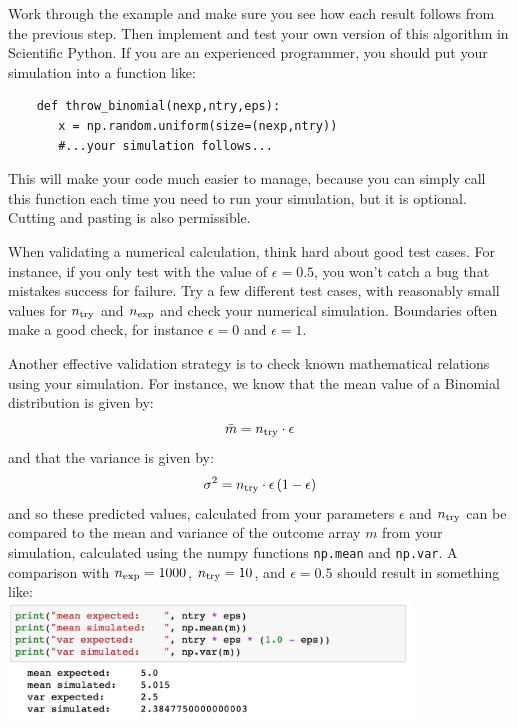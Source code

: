 Work through the example and make sure you see how each result follows
from the previous step.  Then implement and test your own version of
this algorithm in Scientific Python.  If you are an experienced
programmer, you should put your simulation into a function like:
\begin{verbatim}
    def throw_binomial(nexp,ntry,eps):
       x = np.random.uniform(size=(nexp,ntry))
       #...your simulation follows...    
\end{verbatim}

This will make your code much easier to manage, because you can simply
call this function each time you need to run your simulation, but it
is optional.  Cutting and pasting is also permissible.

When validating a numerical calculation, think hard about good test
cases.  For instance, if you only test with the value of $\epsilon =
0.5$, you won't catch a bug that mistakes success for failure.  Try a
few different test cases, with reasonably small values for $n_{\rm
  try}$ and $n_{\rm exp}$ and check your numerical simulation.
Boundaries often make a good check, for instance $\epsilon = 0$ and
$\epsilon = 1$.

Another effective validation strategy is to check known mathematical
relations using your simulation.  For instance, we know that the mean
value of a Binomial distribution is given by:
\begin{equation} \label{eqn:binom_mean}
\bar{m} = n_{\rm try} \cdot \epsilon
\end{equation}
and that the variance is given by:
\begin{equation} \label{eqn:binom_var}
\sigma^2 = n_{\rm try} \cdot \epsilon \, (1 - \epsilon)
\end{equation}
and so these predicted values, calculated from your parameters
$\epsilon$ and $n_{\rm try}$ can be compared to the mean and variance
of the outcome array $m$ from your simulation, calculated using the numpy functions {\tt np.mean} and {\tt np.var}.  A
comparison with $n_{\rm exp}=1000$, $n_{\rm try}=10$, and
$\epsilon=0.5$ should result in something like:\\
\includegraphics[width=0.8\textwidth]{figs/labs/distributions/validate.png}\\ 

